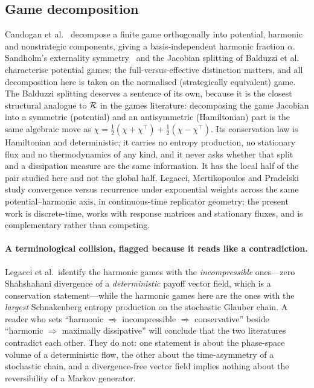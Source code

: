 \subsection{Game decomposition}
Candogan et al.~\cite{candogan2011} decompose a finite game orthogonally into potential,
harmonic and nonstrategic components, giving a basis-independent harmonic fraction $\alpha$.
Sandholm's externality symmetry~\cite{sandholm2010} and the Jacobian splitting of Balduzzi
et al.~\cite{balduzzi2018} characterise potential games; the full-versus-effective
distinction matters, and all decomposition here is taken on the normalised (strategically
equivalent) game. The Balduzzi splitting deserves a sentence of its own, because it is the
closest structural analogue to $\mathcal{R}$ in the games literature: decomposing the game Jacobian
into a symmetric (potential) and an antisymmetric (Hamiltonian) part is the same algebraic
move as $\chi=\tfrac12(\chi+\chi^{\top})+\tfrac12(\chi-\chi^{\top})$. Its conservation law is
Hamiltonian and deterministic; it carries no entropy production, no stationary flux and no
thermodynamics of any kind, and it never asks whether that split and a dissipation measure
are the same information. It has the local half of the pair studied here and not the global
half. Legacci, Mertikopoulos and Pradelski~\cite{legacci2024} study convergence
versus recurrence under exponential weights across the same potential--harmonic axis, in
continuous-time replicator geometry; the present work is discrete-time, works with response
matrices and stationary fluxes, and is complementary rather than competing.

\paragraph{A terminological collision, flagged because it reads like a contradiction.}
Legacci et al.\ identify the harmonic games with the \emph{incompressible} ones---zero
Shahshahani divergence of a \emph{deterministic} payoff vector field, which is a conservation
statement---while the harmonic games here are the ones with the \emph{largest} Schnakenberg
entropy production on the stochastic Glauber chain. A reader who sets ``harmonic
$\Rightarrow$ incompressible $\Rightarrow$ conservative'' beside ``harmonic $\Rightarrow$
maximally dissipative'' will conclude that the two literatures contradict each other. They do
not: one statement is about the phase-space volume of a deterministic flow, the other about
the time-asymmetry of a stochastic chain, and a divergence-free vector field implies nothing
about the reversibility of a Markov generator.

